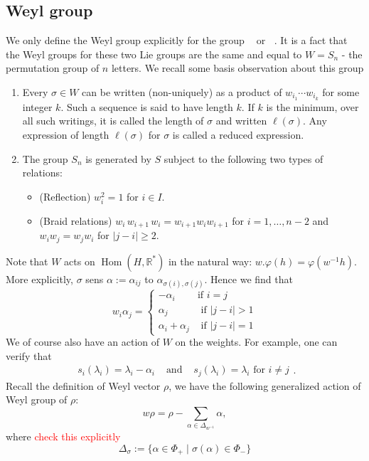 \documentclass[12pt]{article} %
\DeclareMathOperator{\SLn}{\text{SL}_n(\mathbb{R})}
\DeclareMathOperator{\GLn}{\text{GL}_n(\mathbb{R})}
\DeclareMathOperator{\Hom}{Hom}
\begin{document}
\subsection{Weyl group}
We only define the Weyl group explicitly for the group $\SLn$ or $\GLn$. It is a fact that the Weyl groups for
these two Lie groups are the same and equal to $W = S_n$ - the permutation group of $n$ letters.  We recall some basis
observation about this group
\begin{enumerate}
    \item Every $\sigma \in W$ can be written (non-uniquely) as a product of $w_{i_1} \cdots w_{i_k}$ for some integer $k$. Such a sequence is said to have length $k.$ If $k$ is the minimum, over all such writings, it is called the length of $\sigma$ and written $\ell(\sigma)$. Any expression of length $\ell(\sigma)$ for $\sigma$ is called a reduced expression.

    \item The group $S_n$ is generated by $S$ subject to the following two types of relations:
          \begin{itemize}
              \item (Reflection) $w_i^2=1$ for $i \in I$.
              \item (Braid relations) $w_i \, w_{i+1} \, w_i = w_{i+1}w_i w_{i+1}$ for $i = 1, \ldots, n-2$ and $w_i w_j = w_j w_i$ for $|j -i |\geq 2$.
          \end{itemize}
\end{enumerate}
Note that $W$ acts on $\Hom(H, \mathbb{R}^*)$ in the natural way: $w . \varphi(h) = \varphi(w^{-1} h)$. More explicitly,  $\sigma$ sens $\alpha:= \alpha_{ij}$ to $\alpha_{\sigma(i), \sigma(j)}$. Hence we find that
\[w_i \alpha_j = \begin{cases} - \alpha_i          & \mbox{if } i=j           \\
              \alpha_j            & \mbox{ if } |j - i | > 1 \\
              \alpha_i + \alpha_j & \mbox{ if } |j-i|=1\end{cases} \]
We of course also have an action of $W$ on the weights.  For example, one can verify that
\[ \begin{array}{lcr} s_i(\lambda_i) = \lambda_i - \alpha_i & \text{ and } & s_j(\lambda_i) = \lambda_i \mbox{ for } i \neq j \end{array}.\]
Recall the definition of Weyl vector $\rho$, we have the following generalized action of Weyl group of $\rho$:
\[ w \rho = \rho - \sum_{\alpha \in \Delta_{w^{-1}}} \alpha,\]
where \textcolor{red}{check this explicitly}
\[\Delta_{\sigma}:= \{ \alpha \in \Phi_+ \mid \sigma(\alpha) \in \Phi_- \}\]
\end{document}
